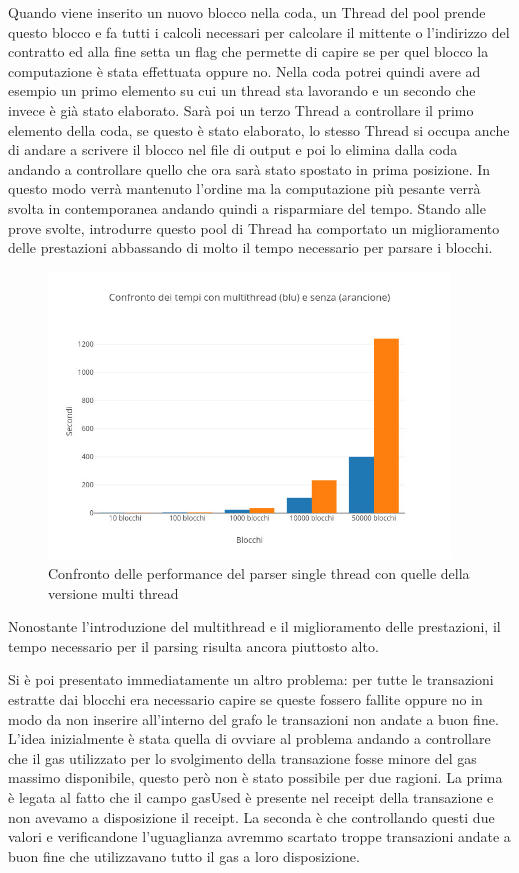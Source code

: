 \documentclass[12pt]{report}
\begin{document}
Quando viene inserito un nuovo blocco nella coda, un Thread del pool prende questo blocco e fa tutti i calcoli necessari per calcolare il mittente o l'indirizzo del contratto ed alla fine setta un flag che permette di capire se per quel blocco la computazione è stata effettuata oppure no.
Nella coda potrei quindi avere ad esempio un primo elemento su cui un thread sta lavorando e un secondo che invece è già stato elaborato.
Sarà poi un terzo Thread a controllare il primo elemento della coda, se questo è stato elaborato, lo stesso Thread si occupa anche di andare a scrivere il blocco nel file di output e poi lo elimina dalla coda andando a controllare quello che ora sarà stato spostato in prima posizione.
In questo modo verrà mantenuto l'ordine ma la computazione più pesante verrà svolta in contemporanea andando quindi a risparmiare del tempo.
Stando alle prove svolte, introdurre questo pool di Thread ha comportato un miglioramento delle prestazioni abbassando di molto il tempo necessario per parsare i blocchi.

\begin{figure}[H]
    \includegraphics[width=0.95\textwidth]{Plot2.jpg}
    \caption{Confronto delle performance del parser single thread con quelle della versione multi thread}
\end{figure}


Nonostante l'introduzione del multithread e il miglioramento delle prestazioni, il tempo necessario per il parsing risulta ancora piuttosto alto.

Si è poi presentato immediatamente un altro problema: per tutte le transazioni estratte dai blocchi era necessario capire se queste fossero fallite oppure no in modo da non inserire all'interno del grafo le transazioni non andate a buon fine.
L'idea inizialmente è stata quella di ovviare al problema andando a controllare che il gas utilizzato per lo svolgimento della transazione fosse minore del gas massimo disponibile, questo però non è stato possibile per due ragioni. La prima è legata al fatto che il campo gasUsed è presente nel receipt della transazione e non avevamo a disposizione il receipt. La seconda è che controllando questi due valori e verificandone l'uguaglianza avremmo scartato troppe transazioni andate a buon fine che utilizzavano tutto il gas a loro disposizione. 
\end{document}
